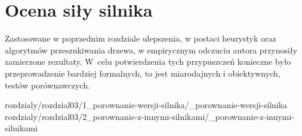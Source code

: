 
\chapter {Ocena siły silnika}
\label {ch: ocena-sily-silnika}

Zastosowane w poprzednim rozdziale ulepszenia, w postaci heurystyk oraz algorytmów przeszukiwania drzewa, w empirycznym odczuciu autora przynosiły zamierzone rezultaty.
W~celu potwierdzenia tych przypuszczeń konieczne było przeprowadzenie bardziej formalnych, to jest miarodajnych i obiektywnych, testów porównawczych.

 {rozdzialy/rozdzial03/1_porownanie-wersji-silnika/_porownanie-wersji-silnika}
 {rozdzialy/rozdzial03/2_porownanie-z-innymi-silnikami/_porownanie-z-innymi-silnikami}


